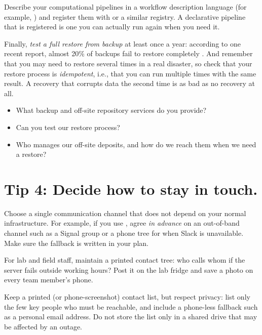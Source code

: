 \documentclass[10pt,letterpaper]{article}
\begin{document}
Describe your computational pipelines in a workflow description language (for
example, ) and register them with
 or a similar registry. A declarative
pipeline that is registered is one you can actually run again when you need it.

Finally, \emph{test a full restore from backup} at least once a year: according
to one recent report, almost 20\% of backups fail to restore completely
\cite{backblaze2024}.  And remember that you may need to restore several times
in a real disaster, so check that your restore process is \emph{idempotent},
i.e., that you can run multiple times with the same result.  A recovery that
corrupts data the second time is as bad as no recovery at all.

\begin{notebox}
  \begin{itemize}
  \item What backup and off-site repository services do you provide?
  \item Can you test our restore process?
  \item Who manages our off-site deposits, and how do we reach them when we need
    a restore?
  \end{itemize}
\end{notebox}

\section*{Tip 4: Decide how to stay in touch.}

Choose a single communication channel that does not depend on your normal
infrastructure. For example, if you use ,
agree \emph{in advance} on an out-of-band channel such as a Signal group or a
phone tree for when Slack is unavailable.  Make sure the fallback is written in
your plan.

For lab and field staff, maintain a printed contact tree: who calls whom if the
server fails outside working hours? Post it on the lab fridge and save a photo
on every team member's phone.

Keep a printed (or phone-screenshot) contact list, but respect privacy: list
only the few key people who must be reachable, and include a phone-less fallback
such as a personal email address. Do not store the list only in a shared drive
that may be affected by an outage.
\end{document}
